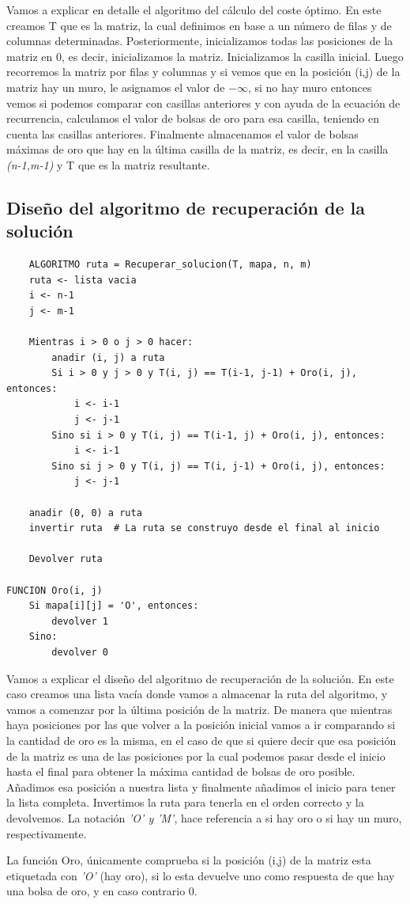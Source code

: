 Vamos a explicar en detalle el algoritmo del cálculo del coste óptimo. En este creamos T que es la matriz, la cual definimos en base a un número de filas y de columnas determinadas. Posteriormente, inicializamos todas las posiciones de la matriz en 0, es decir, inicializamos la matriz. Inicializamos la casilla inicial. Luego recorremos la matriz por filas y columnas y si vemos que en la posición (i,j) de la matriz hay un muro, le asignamos el valor de \(-\infty\), si no hay muro entonces vemos si podemos comparar con casillas anteriores y con ayuda de la ecuación de recurrencia, calculamos el valor de bolsas de oro para esa casilla, teniendo en cuenta las casillas anteriores. Finalmente almacenamos el valor de bolsas máximas de oro que hay en la última casilla de la matriz, es decir, en la casilla \textit{(n-1,m-1)} y T que es la matriz resultante.

\subsection{Diseño del algoritmo de recuperación de la solución}
\begin{lstlisting}
    ALGORITMO ruta = Recuperar_solucion(T, mapa, n, m)
    ruta <- lista vacia
    i <- n-1
    j <- m-1
    
    Mientras i > 0 o j > 0 hacer:
        anadir (i, j) a ruta
        Si i > 0 y j > 0 y T(i, j) == T(i-1, j-1) + Oro(i, j), entonces:
            i <- i-1
            j <- j-1
        Sino si i > 0 y T(i, j) == T(i-1, j) + Oro(i, j), entonces:
            i <- i-1
        Sino si j > 0 y T(i, j) == T(i, j-1) + Oro(i, j), entonces:
            j <- j-1
    
    anadir (0, 0) a ruta
    invertir ruta  # La ruta se construyo desde el final al inicio
    
    Devolver ruta

FUNCION Oro(i, j)
    Si mapa[i][j] = 'O', entonces: 
        devolver 1
    Sino:
        devolver 0

\end{lstlisting}

Vamos a explicar el diseño del algoritmo de recuperación de la solución. En este caso creamos una lista vacía donde vamos a almacenar la ruta del algoritmo, y vamos
a comenzar por la última posición de la matriz. De manera que mientras haya posiciones por las que volver a la posición inicial vamos a ir comparando si la cantidad de oro es la misma, en el caso de que si quiere decir que esa posición de la matriz es una de las posiciones por la cual podemos pasar desde el inicio hasta el final para obtener la máxima cantidad de bolsas de oro posible. Añadimos esa posición a nuestra lista y finalmente añadimos el inicio para tener la lista completa. Invertimos la ruta para tenerla en el orden correcto y la devolvemos. La notación \textit{'O' y 'M'}, hace referencia a si hay oro o si hay un muro, respectivamente.

La función Oro, únicamente comprueba si la posición (i,j) de la matriz esta etiquetada con \textit{'O'} (hay oro), si lo esta devuelve uno como respuesta de que hay una bolsa de oro, y en caso contrario 0.




    
